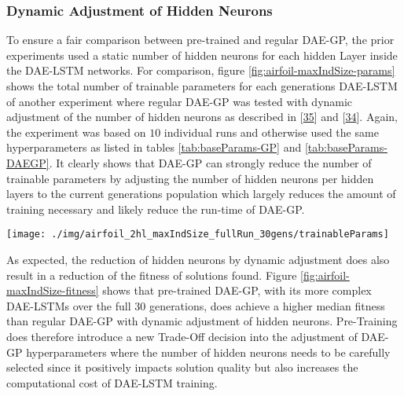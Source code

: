 \documentclass[
  11pt,
]{article}
\let\origfigure\figure
\let\endorigfigure\endfigure
\renewenvironment{figure}[1][2] {
    \expandafter\origfigure\expandafter[H]
} {
    \endorigfigure
}
\begin{document}
\hypertarget{dynamic-adjustment-of-hidden-neurons}{%
\subsubsection{Dynamic Adjustment of Hidden Neurons}\label{dynamic-adjustment-of-hidden-neurons}}

To ensure a fair comparison between pre-trained and regular DAE-GP, the prior experiments used a static number of hidden neurons for each hidden Layer inside the DAE-LSTM networks.
For comparison, figure \ref{fig:airfoil-maxIndSize-params} shows the total number of trainable parameters for each generations DAE-LSTM of another experiment where regular DAE-GP was tested with dynamic adjustment of the number of hidden neurons as described in {[}\protect\hyperlink{ref-dae-gp_2020_rtree}{35}{]} and {[}\protect\hyperlink{ref-dae-gp_2022_symreg}{34}{]}.
Again, the experiment was based on \(10\) individual runs and otherwise used the same hyperparameters as listed in tables \ref{tab:baseParams-GP} and \ref{tab:baseParams-DAEGP}.
It clearly shows that DAE-GP can strongly reduce the number of trainable parameters by adjusting the number of hidden neurons per hidden layers to the current generations population which largely reduces the amount of training necessary and likely reduce the run-time of DAE-GP.

\begin{figure}[c]

{\centering \texttt{[image: ./img/airfoil\_2hl\_maxIndSize\_fullRun\_30gens/trainableParams]} 

}

\caption{Median Number of trainable Parameters over 30 Generations - Airfoil - Dynamic adjustment of regular DAE-GP}\label{fig:airfoil-maxIndSize-params}
\end{figure}

As expected, the reduction of hidden neurons by dynamic adjustment does also result in a reduction of the fitness of solutions found.
Figure \ref{fig:airfoil-maxIndSize-fitness} shows that pre-trained DAE-GP, with its more complex DAE-LSTMs over the full 30 generations, does achieve a higher median fitness than regular DAE-GP with dynamic adjustment of hidden neurons.
Pre-Training does therefore introduce a new Trade-Off decision into the adjustment of DAE-GP hyperparameters where the number of hidden neurons needs to be carefully selected since it positively impacts solution quality but also increases the computational cost of DAE-LSTM training.
\end{document}
